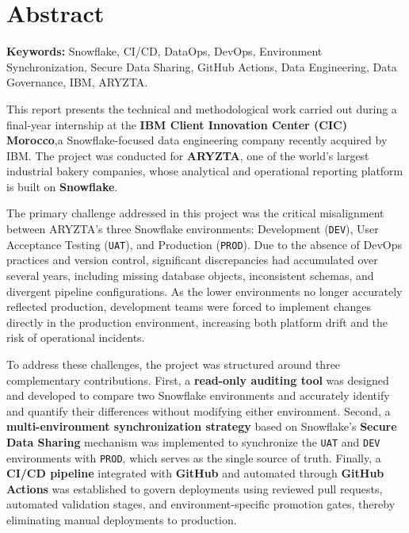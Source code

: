 \chapter*{Abstract}

\noindent\textbf{Keywords:} Snowflake, CI/CD, DataOps, DevOps, Environment Synchronization, Secure Data Sharing, GitHub Actions, Data Engineering, Data Governance, IBM, ARYZTA.

\vspace{0.5cm}

This report presents the technical and methodological work carried out during a final-year internship at the \textbf{IBM Client Innovation Center (CIC) Morocco},a Snowflake-focused data engineering company recently acquired by IBM. The project was conducted for \textbf{ARYZTA}, one of the world's largest industrial bakery companies, whose analytical and operational reporting platform is built on \textbf{Snowflake}.

The primary challenge addressed in this project was the critical misalignment between ARYZTA's three Snowflake environments: Development (\texttt{DEV}), User Acceptance Testing (\texttt{UAT}), and Production (\texttt{PROD}). Due to the absence of DevOps practices and version control, significant discrepancies had accumulated over several years, including missing database objects, inconsistent schemas, and divergent pipeline configurations. As the lower environments no longer accurately reflected production, development teams were forced to implement changes directly in the production environment, increasing both platform drift and the risk of operational incidents.

To address these challenges, the project was structured around three complementary contributions. First, a \textbf{read-only auditing tool} was designed and developed to compare two Snowflake environments and accurately identify and quantify their differences without modifying either environment. Second, a \textbf{multi-environment synchronization strategy} based on Snowflake's \textbf{Secure Data Sharing} mechanism was implemented to synchronize the \texttt{UAT} and \texttt{DEV} environments with \texttt{PROD}, which serves as the single source of truth. Finally, a \textbf{CI/CD pipeline} integrated with \textbf{GitHub} and automated through \textbf{GitHub Actions} was established to govern deployments using reviewed pull requests, automated validation stages, and environment-specific promotion gates, thereby eliminating manual deployments to production.

